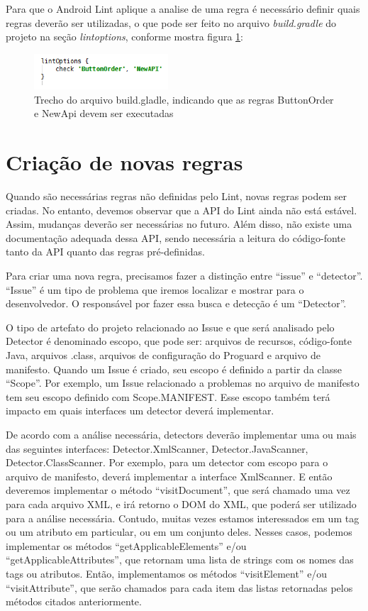 Para que o Android Lint aplique a analise de uma regra é necessário definir quais 
regras deverão ser utilizadas, o que pode ser feito no arquivo {\it build.gradle} do 
projeto na seção {\it lintoptions}, conforme mostra figura \ref{lintoptions}:

\begin{figure}[h]
    \centering
    \includegraphics[width=5cm]{img/lintoptions}
    \caption[]{Trecho do arquivo build.gladle, indicando que as regras ButtonOrder e 
    NewApi devem ser executadas}
    \label{lintoptions}
\end{figure}

\section{Criação de novas regras}

Quando são necessárias regras não definidas pelo Lint, novas regras podem ser criadas. 
No entanto, devemos observar que a API do Lint ainda não está estável. Assim, mudanças 
deverão ser necessárias no futuro. Além disso, não existe uma documentação adequada 
dessa API, sendo necessária a leitura do código-fonte tanto da API quanto das regras 
pré-definidas.

Para criar uma nova regra, precisamos fazer a distinção entre “issue” e “detector”. 
“Issue” é um tipo de problema que iremos localizar e mostrar para o desenvolvedor. 
O responsável por fazer essa busca e detecção é um “Detector”.

O tipo de artefato do projeto relacionado ao Issue e que será analisado pelo 
Detector é denominado escopo, que pode ser: arquivos de recursos, código-fonte Java, 
arquivos .class, arquivos de configuração do Proguard e arquivo de manifesto. Quando 
um Issue é criado, seu escopo é definido a partir da classe “Scope”. Por exemplo, 
um Issue relacionado a problemas no arquivo de manifesto tem seu escopo definido 
com Scope.MANIFEST. Esse escopo também terá impacto em quais interfaces um detector 
deverá implementar.

De acordo com a análise necessária, detectors deverão implementar uma ou mais das 
seguintes interfaces: Detector.XmlScanner, Detector.JavaScanner, Detector.ClassScanner. 
Por exemplo, para um detector com escopo para o arquivo de manifesto, deverá implementar 
a interface XmlScanner. E então deveremos implementar o método “visitDocument”, que será 
chamado uma vez para cada arquivo XML, e irá retorno o DOM do XML, que poderá ser utilizado 
para a análise necessária. Contudo, muitas vezes estamos interessados em um tag ou um atributo 
em particular, ou em um conjunto deles. Nesses casos, podemos implementar os métodos 
“getApplicableElements” e/ou “getApplicableAttributes”, que retornam uma lista de strings 
com os nomes das tags ou atributos. Então, implementamos os métodos “visitElement” e/ou 
“visitAttribute”, que serão chamados para cada item das listas retornadas pelos métodos 
citados anteriormente.

